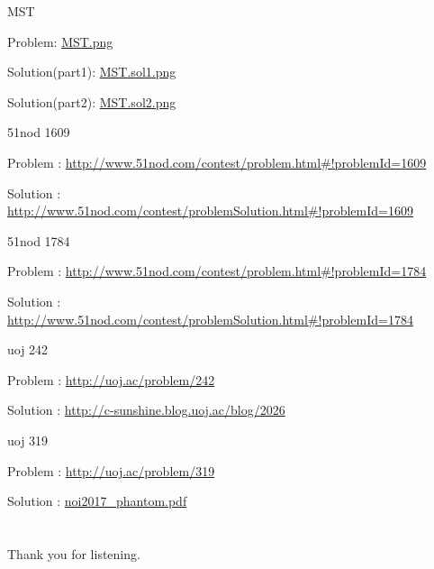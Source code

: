 \documentclass[UTF8]{beamer}
\begin{document}
	\begin{frame}{MST}

	Problem: \url{MST.png}

	Solution(part1): \url{MST.sol1.png}

	Solution(part2): \url{MST.sol2.png}

	\end{frame}

	\begin{frame}{51nod 1609}

	Problem : \url{http://www.51nod.com/contest/problem.html\#!problemId=1609}

	Solution : \url{http://www.51nod.com/contest/problemSolution.html\#!problemId=1609}

	\end{frame}

	\begin{frame}{51nod 1784}

	Problem : \url{http://www.51nod.com/contest/problem.html\#!problemId=1784}

	Solution : \url{http://www.51nod.com/contest/problemSolution.html\#!problemId=1784}

	\end{frame}

	\begin{frame}{uoj 242}

	Problem : \url{http://uoj.ac/problem/242}

	Solution : \url{http://c-sunshine.blog.uoj.ac/blog/2026}

	\end{frame}

	\begin{frame}{uoj 319}

	Problem : \url{http://uoj.ac/problem/319}

	Solution : \url{noi2017_phantom.pdf}

	\end{frame}

	\section{}

	\begin{frame}

	Thank you for listening.

	\end{frame}
\end{document}
